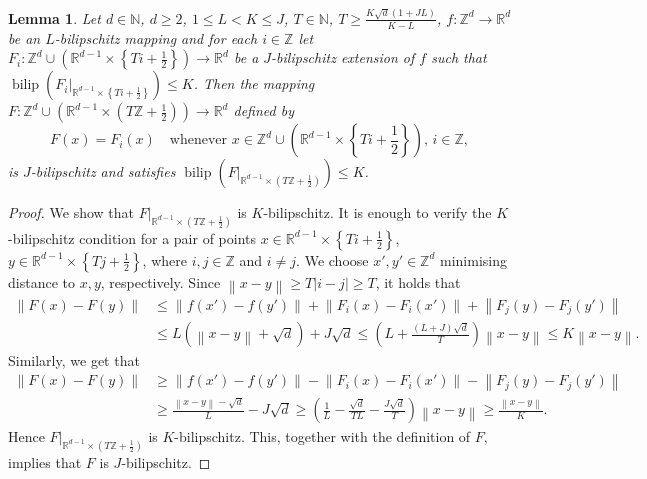 \documentclass[a4paper, bibliography=totoc]{scrartcl}
\newtheorem{lemma}[define]{Lemma}
\numberwithin{claimcounter}{define}
\newcommand{\R}{\mathbb{R}}
\newcommand{\Z}{\mathbb{Z}}
\newcommand{\N}{\mathbb{N}}
\newcommand{\bilip}{\operatorname{bilip}}
\newcommand{\abs}[1]{\left|#1\right|}
\newcommand{\enorm}[1]{\left\|#1\right\|}
\newcommand{\set}[1]{\left\{#1\right\}}
\newcommand{\br}[1]{\left(#1\right)}
\begin{document}
\begin{lemma}\label{lemma:far_apart_bilipschitz}
	Let $d\in\N$, $d\geq 2$, $1\leq L<K\leq J$, $T\in\N$, $T\geq \frac{K\sqrt{d}\br{1+JL}}{K-L}$, $f\colon\Z^{d} \to \R^{d}$ be an $L$-bilipschitz mapping and for each $i\in\Z$ let $F_{i}\colon \Z^{d}\cup\br{\R^{d-1}\times \set{Ti+\frac{1}{2}}}\to \R^{d}$ be a $J$-bilipschitz extension of $f$ such that $\bilip\br{F_{i}|_{\R^{d-1}\times\set{Ti+\frac{1}{2}}}}\leq K$. Then the mapping $F\colon \Z^{d}\cup\br{\R^{d-1}\times \br{T\Z+\frac{1}{2}}}\to\R^{d}$ defined by
	\begin{equation*}
	F(x)=F_{i}(x)\quad\text{whenever }x\in\Z^{d}\cup\br{\R^{d-1}\times\set{Ti+\frac{1}{2}}},\, i\in\Z,
	\end{equation*}
	is $J$-bilipschitz and satisfies $\bilip\br{F|_{\R^{d-1}\times\br{T\Z+\frac{1}{2}}}}\leq K$.
\end{lemma}
\begin{proof}
	We show that $F|_{\R^{d-1}\times\br{T\Z+\frac{1}{2}}}$ is $K$-bilipschitz. It is enough to verify the $K$-bilipschitz condition for a pair of points $x\in \R^{d-1}\times\set{Ti+\frac{1}{2}}$, $y\in\R^{d-1}\times\set{Tj+\frac{1}{2}}$, where $i,j\in\Z$ and $i\neq j$. We choose $x', y'\in\Z^{d}$ minimising distance to $x,y$, respectively. Since $\enorm{x-y}\geq T\abs{i-j}\geq T$, it holds that
	\begin{align*}
	\enorm{F(x)-F(y)}&\leq\enorm{f(x')-f(y')}+\enorm{F_i(x)-F_i(x')}+\enorm{F_j(y)-F_j(y')}\\
	&\leq L(\enorm{x-y}+\sqrt{d})+J\sqrt{d}\leq\br{L+\frac{(L+J)\sqrt{d}}{T}}\enorm{x-y}\leq K\enorm{x-y}.
	\end{align*}
	Similarly, we get that
	\begin{align*}
	\enorm{F(x)-F(y)}&\geq\enorm{f(x')-f(y')}-\enorm{F_i(x)-F_i(x')}-\enorm{F_j(y)-F_j(y')}\\
	&\geq\frac{\enorm{x-y}-\sqrt{d}}{L}-J\sqrt{d}\geq\br{\frac{1}{L}-\frac{\sqrt{d}}{TL}-\frac{J\sqrt{d}}{T}}\enorm{x-y}\geq \frac{\enorm{x-y}}{K}.
	\end{align*}
	Hence $F|_{\R^{d-1}\times\br{T\Z+\frac{1}{2}}}$ is $K$-bilipschitz. This, together with the definition of $F$, implies that $F$ is $J$-bilipschitz.
\end{proof}
\end{document}
